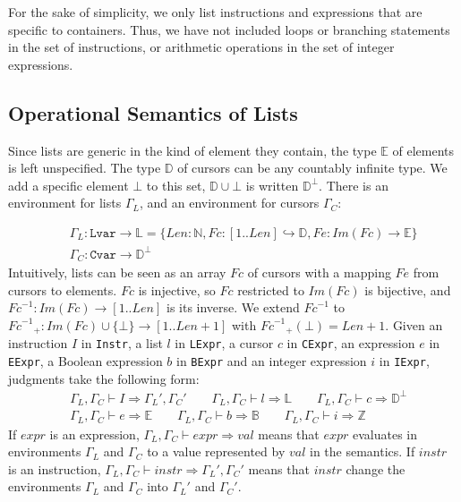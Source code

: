 \documentclass[runningheads,a4paper]{llncs}
\newcommand{\envL}{\ensuremath{\Gamma_L}\xspace}
\newcommand{\envC}{\ensuremath{\Gamma_C}\xspace}
\newcommand{\eval}{\envL, \envC \vdash}
\newcommand{\Fc}{\ensuremath{\mathit{Fc}}\xspace}
\newcommand{\FcInv}{\ensuremath{\mathit{Fc}^{-1}}\xspace}
\newcommand{\Fe}{\ensuremath{\mathit{Fe}}\xspace}
\newcommand{\ImFc}{\ensuremath{\mathit{Im}(\Fc)}\xspace}
\newcommand{\TypL}{\ensuremath{\mathbb{L}}\xspace}
\newcommand{\TypE}{\ensuremath{\mathbb{E}}\xspace}
\newcommand{\TypD}{\ensuremath{\mathbb{D}}\xspace}
\newcommand{\Nat}{\ensuremath{\mathbb{N}}\xspace}
\newcommand{\Int}{\ensuremath{\mathbb{Z}}\xspace}
\newcommand{\Bool}{\ensuremath{\mathbb{B}}\xspace}
\newcommand{\Len}{\ensuremath{\mathit{Len}}\xspace}
\newcommand{\beforesub}{\vspace{-0.2cm}}
\newcommand{\aftersub}{\vspace{-0.1cm}}
\begin{document}
For the sake of simplicity, we only list instructions and expressions that are
specific to containers. Thus, we have not included loops or branching
statements in the set of instructions, or arithmetic operations in the set of
integer expressions.

\beforesub
\subsection{Operational Semantics of Lists}
\aftersub

Since lists are generic in the kind of element they contain, the type \TypE of
elements is left unspecified. The type \TypD of cursors can be any countably infinite type.
We add a specific element $\bot$ to this set, $\TypD\cup\bot$ is written $\TypD^\bot$.
There is an environment for lists \envL, and an
environment for cursors \envC:

\begin{eqnarray*}
&&\envL : \texttt{Lvar} \rightarrow \TypL = \{\Len
: \Nat, \Fc : [1 .. \Len] \hookrightarrow \TypD, \Fe : \ImFc
\rightarrow \TypE\} \\
&&\envC : \texttt{Cvar} \rightarrow \TypD^\bot
\end{eqnarray*}
Intuitively, lists can be seen as an array $\Fc$ of cursors with a mapping
$\Fe$ from cursors to elements. \Fc is injective, so \Fc restricted to \ImFc is
bijective, and $\FcInv:\ImFc \rightarrow[1 .. \Len]$ is its inverse. We
extend \FcInv to $\FcInv_+: \ImFc\cup \{\bot\} \rightarrow [1 .. \Len+1]$
with $\FcInv_+(\bot)=\Len+1$.
Given an instruction $I$ in \texttt{Instr}, a list $l$ in \texttt{LExpr}, a
cursor $c$ in \texttt{CExpr}, an expression $e$ in \texttt{EExpr}, a Boolean
expression $b$ in \texttt{BExpr} and an integer expression $i$ in
\texttt{IExpr}, judgments take the following form:
\begin{eqnarray*}
&\eval I \Rightarrow \envL',\envC' 
\qquad \eval l \Rightarrow \TypL
\qquad \eval c \Rightarrow \TypD^\bot\\
&\eval e \Rightarrow \TypE
\qquad \eval b \Rightarrow\Bool
\qquad \eval i \Rightarrow\Int
\end{eqnarray*}
If $\mathit{expr}$ is an expression, $\eval \mathit{expr} \Rightarrow \mathit{val}$
means that $\mathit{expr}$ evaluates in environments $\envL$ and $\envC$ to a
value represented by $\mathit{val}$ in the semantics. 
If $\mathit{instr}$ is an instruction, $\eval \mathit{instr} \Rightarrow \envL',\envC'$
means that $instr$ change the environments $\envL$ and $\envC$ into $\envL'$ and $\envC'$.
\end{document}
